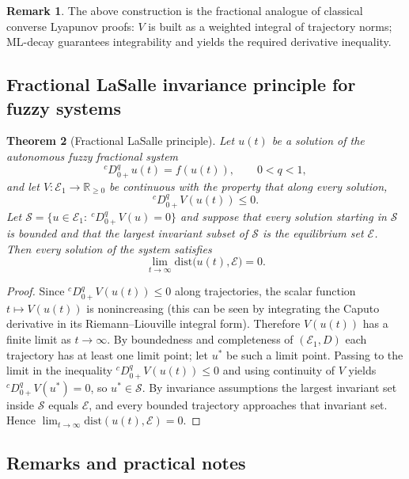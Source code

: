 \documentclass[11pt,a4paper]{article}
\theoremstyle{plain}
\newtheorem{theorem}{Theorem}[section]
\theoremstyle{definition}
\newtheorem{remark}[theorem]{Remark}
\theoremstyle{remark}
\newcommand{\E}{\mathcal{E}_1}
\newcommand{\Haus}{D}
\begin{document}
	\begin{remark}
		The above construction is the fractional analogue of classical converse Lyapunov proofs: \(V\) is built as a weighted integral of trajectory norms; ML-decay guarantees integrability and yields the required derivative inequality.
	\end{remark}
	
	
	\subsection{Fractional LaSalle invariance principle for fuzzy systems}
	
	\begin{theorem}[Fractional LaSalle principle]\label{thm:lasalle}
		Let \(u(t)\) be a solution of the autonomous fuzzy fractional system
		\[
		{}^cD_{0+}^q u(t)=f(u(t)),\qquad 0<q<1,
		\]
		and let \(V:\E\to\mathbb{R}_{\ge0}\) be continuous with the property that along every solution,
		\[
		{}^cD_{0+}^q V(u(t))\le0.
		\]
		Let \(\mathcal S=\{u\in\E:\ {}^cD_{0+}^q V(u)=0\}\) and suppose that every solution starting in \(\mathcal S\) is bounded and that the largest invariant subset of \(\mathcal S\) is the equilibrium set \(\mathcal E\). Then every solution of the system satisfies
		\[
		\lim_{t\to\infty}\mathrm{dist}\big(u(t),\mathcal E\big)=0.
		\]
	\end{theorem}
	
	\begin{proof}
		Since \({}^cD_{0+}^q V(u(t))\le0\) along trajectories, the scalar function \(t\mapsto V(u(t))\) is nonincreasing (this can be seen by integrating the Caputo derivative in its Riemann--Liouville integral form). Therefore \(V(u(t))\) has a finite limit as \(t\to\infty\). By boundedness and completeness of \((\E,\Haus)\) each trajectory has at least one limit point; let \(u^*\) be such a limit point. Passing to the limit in the inequality \({}^cD_{0+}^q V(u(t))\le0\) and using continuity of \(V\) yields \({}^cD_{0+}^q V(u^*)=0\), so \(u^*\in\mathcal S\). By invariance assumptions the largest invariant set inside \(\mathcal S\) equals \(\mathcal E\), and every bounded trajectory approaches that invariant set. Hence \(\lim_{t\to\infty}\mathrm{dist}(u(t),\mathcal E)=0\).
	\end{proof}
	
	\subsection{Remarks and practical notes}
	
\end{document}
